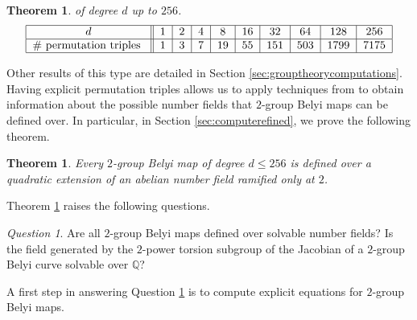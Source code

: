 \documentclass{dcthesis}
\newcommand{\QQ}{\mathbb Q}
\numberwithin{equation}{section}
\newtheorem{theorem}[equation]{Theorem}
\newtheorem{conj}[equation]{Conjecture}
\theoremstyle{definition}
\theoremstyle{remark}
\newtheorem{question}[equation]{Question}
\begin{document}
{{{\begin{theorem}
      of degree $d$ up to $256$.
      \begin{equation}
        \label{eqn:}
        \begin{tabular}{|c||c|c|c|c|c|c|c|c|c|}
          \hline
          $d$ & $1$ & $2$ & $4$ & $8$ & $16$ & $32$ & $64$ & $128$ & $256$\\
          \hline
          \#\text{ permutation triples } & $1$ & $3$ & $7$ & $19$ & $55$ & $151$ & $503$ & $1799$ & $7175$\\
          \hline
        \end{tabular}
      \end{equation}
    \end{theorem}
    Other results of this type are
    detailed in
    Section \ref{sec:grouptheorycomputations}.
    Having explicit permutation triples
    allows us to apply techniques from
    \cite{belyidb}
    to obtain information about the possible
    number fields that $2$-group Belyi
    maps can be defined over.
    In particular,
    in Section \ref{sec:computerefined},
    we prove the
    following theorem.
    \begin{theorem}
      \label{thm:256_results}
      Every $2$-group Belyi map
      of degree $d\leq 256$ is defined over
      a quadratic extension of an abelian number field
      ramified only at $2$.
    \end{theorem}
    Theorem \ref{thm:256_results}
    raises the following questions.
    \begin{question}
      \label{ques:solvablemotivation}
      Are all $2$-group Belyi maps defined over solvable
      number fields?
      Is the field generated
      by the $2$-power torsion subgroup of the
      Jacobian of a $2$-group Belyi curve
      solvable over $\QQ$?
    \end{question}
    A first step in answering
    Question
    \ref{ques:solvablemotivation}
    is to compute explicit equations for
    $2$-group Belyi maps.
}}}
\end{document}
